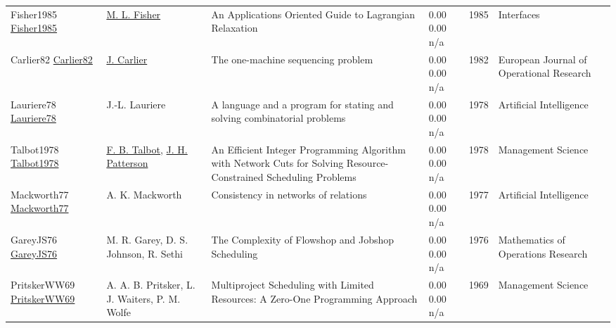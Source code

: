 {\begin{longtable}{p{3cm}p{5cm}p{10cm}p{1cm}rp{2.5cm}l}
Fisher1985 \href{http://dx.doi.org/10.1287/inte.15.2.10}{Fisher1985} & \hyperref[auth:a1769]{M. L. Fisher} & An Applications Oriented Guide to Lagrangian Relaxation & \noindent{}\textcolor{black!50}{0.00} \textcolor{black!50}{0.00} n/a & 1985 & \cellcolor{red!20}Interfaces & \cite{Fisher1985}\\
Carlier82 \href{http://dx.doi.org/10.1016/s0377-2217(82)80007-6}{Carlier82} & \hyperref[auth:a844]{J. Carlier} & The one-machine sequencing problem & \noindent{}\textcolor{black!50}{0.00} \textcolor{black!50}{0.00} n/a & 1982 & European Journal of Operational Research & \cite{Carlier82}\\
Lauriere78 \href{http://dx.doi.org/10.1016/0004-3702(78)90029-2}{Lauriere78} & J.-L. Lauriere & A language and a program for stating and solving combinatorial problems & \noindent{}\textcolor{black!50}{0.00} \textcolor{black!50}{0.00} n/a & 1978 & Artificial Intelligence & \cite{Lauriere78}\\
Talbot1978 \href{http://dx.doi.org/10.1287/mnsc.24.11.1163}{Talbot1978} & \hyperref[auth:a1495]{F. B. Talbot}, \hyperref[auth:a1496]{J. H. Patterson} & An Efficient Integer Programming Algorithm with Network Cuts for Solving Resource-Constrained Scheduling Problems & \noindent{}\textcolor{black!50}{0.00} \textcolor{black!50}{0.00} n/a & 1978 & Management Science & \cite{Talbot1978}\\
Mackworth77 \href{http://dx.doi.org/10.1016/0004-3702(77)90007-8}{Mackworth77} & A. K. Mackworth & Consistency in networks of relations & \noindent{}\textcolor{black!50}{0.00} \textcolor{black!50}{0.00} n/a & 1977 & Artificial Intelligence & \cite{Mackworth77}\\
GareyJS76 \href{http://dx.doi.org/10.1287/moor.1.2.117}{GareyJS76} & M. R. Garey, D. S. Johnson, R. Sethi & The Complexity of Flowshop and Jobshop Scheduling & \noindent{}\textcolor{black!50}{0.00} \textcolor{black!50}{0.00} n/a & 1976 & Mathematics of Operations Research & \cite{GareyJS76}\\
PritskerWW69 \href{http://dx.doi.org/10.1287/mnsc.16.1.93}{PritskerWW69} & A. A. B. Pritsker, L. J. Waiters, P. M. Wolfe & Multiproject Scheduling with Limited Resources: A Zero-One Programming Approach & \noindent{}\textcolor{black!50}{0.00} \textcolor{black!50}{0.00} n/a & 1969 & Management Science & \cite{PritskerWW69}\\
\end{longtable}
}

